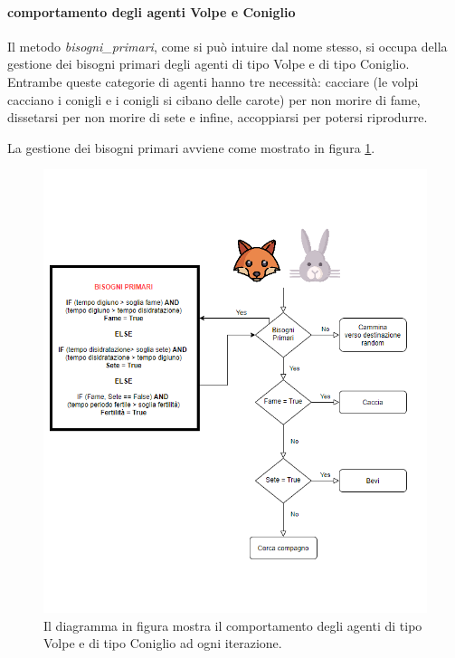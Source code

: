 \documentclass[11pt]{article}
\begin{document}
\paragraph{comportamento degli agenti Volpe e Coniglio}

Il metodo \emph{bisogni\_primari}, come si può intuire dal nome stesso, si occupa della gestione dei bisogni primari degli agenti di tipo Volpe e di tipo Coniglio. Entrambe queste categorie di agenti hanno tre necessità: cacciare (le volpi cacciano i conigli e i conigli si cibano delle carote) per non morire di fame, dissetarsi per non morire di sete e infine, accoppiarsi per potersi riprodurre. 

La gestione dei bisogni primari avviene come mostrato in figura \ref{fig:diagrammaComportamentale}. 
\begin{figure}
     \centering
     \includegraphics[scale = 0.7]{diagramma_comportamentale.png}
     \caption{Il diagramma in figura mostra il comportamento degli agenti di tipo Volpe e di tipo Coniglio ad ogni iterazione.}
     \label{fig:diagrammaComportamentale}
\end{figure}
\end{document}
